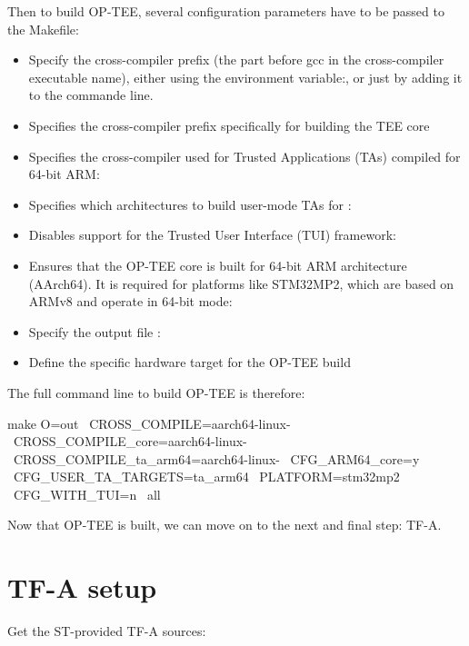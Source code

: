 Then to build OP-TEE, several configuration parameters have to be
passed to the Makefile:

\begin{itemize}
\item Specify the cross-compiler prefix (the part before gcc in the
  cross-compiler executable name), either using the environment
  variable:, or just
  by adding it to the  commande line.
\item Specifies the cross-compiler prefix specifically for building
  the TEE core 
\item Specifies the cross-compiler used for Trusted Applications (TAs)
  compiled for 64-bit ARM: 
\item Specifies which architectures to build user-mode TAs for :
\item Disables support for the Trusted User Interface (TUI) framework:
\item Ensures that the OP-TEE core is built for 64-bit ARM
  architecture (AArch64).  It is required for platforms like STM32MP2,
  which are based on ARMv8 and operate in 64-bit mode: 
\item Specify the output file : 
\item Define the specific hardware target for the OP-TEE build
\end{itemize}

The full command line to build OP-TEE is therefore:

\begin{bashinput}
make O=out \
  CROSS_COMPILE=aarch64-linux- \
  CROSS_COMPILE_core=aarch64-linux- \
  CROSS_COMPILE_ta_arm64=aarch64-linux- \
  CFG_ARM64_core=y \
  CFG_USER_TA_TARGETS=ta_arm64 \
  PLATFORM=stm32mp2 \
  CFG_WITH_TUI=n \
  all
\end{bashinput}

Now that OP-TEE is built, we can move on to the next and final step:
TF-A.

\section{TF-A setup}

Get the ST-provided TF-A sources:

